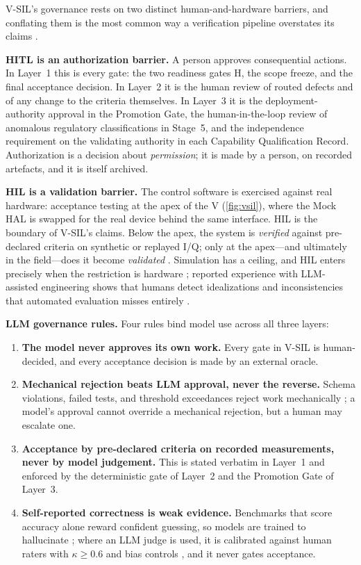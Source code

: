 \documentclass[11pt,a4paper]{article}
\newcommand{\verified}{\emph{verified}}
\newcommand{\validated}{\emph{validated}}
\begin{document}
V-SIL's governance rests on two distinct human-and-hardware barriers, and conflating them is the
most common way a verification pipeline overstates its claims \cite{opalrt2026,sheridan2026b}.

\textbf{HITL is an authorization barrier.} A person approves consequential actions. In Layer~1
this is every gate: the two readiness gates H, the scope freeze, and the final acceptance
decision. In Layer~2 it is the human review of routed defects and of any change to the criteria
themselves. In Layer~3 it is the deployment-authority approval in the Promotion Gate, the
human-in-the-loop review of anomalous regulatory classifications in Stage~5, and the
independence requirement on the validating authority in each Capability Qualification Record.
Authorization is a decision about \emph{permission}; it is made by a person, on recorded
artefacts, and it is itself archived.

\textbf{HIL is a validation barrier.} The control software is exercised against real hardware:
acceptance testing at the apex of the V (\cref{fig:vsil}), where the Mock HAL is swapped for the
real device behind the same interface. HIL is the boundary of V-SIL's claims. Below the apex, the
system is \verified{} against pre-declared criteria on synthetic or replayed I/Q; only at the
apex---and ultimately in the field---does it become \validated{} \cite{sheridan2026b}. Simulation
has a ceiling, and HIL enters precisely when the restriction is hardware \cite{opalrt2026};
reported experience with LLM-assisted engineering shows that humans detect idealizations and
inconsistencies that automated evaluation misses entirely \cite{heinrichs2026,bajestani2026}.

\textbf{LLM governance rules.} Four rules bind model use across all three layers:

\begin{enumerate}[label=\textbf{G\arabic*.}]
  \item \textbf{The model never approves its own work.} Every gate in V-SIL is human-decided,
    and every acceptance decision is made by an external oracle.
  \item \textbf{Mechanical rejection beats LLM approval, never the reverse.} Schema violations,
    failed tests, and threshold exceedances reject work mechanically
    \cite{mcp2025,tooluse2026}; a model's approval cannot override a mechanical rejection, but a
    human may escalate one.
  \item \textbf{Acceptance by pre-declared criteria on recorded measurements, never by model
    judgement.} This is stated verbatim in Layer~1 and enforced by the deterministic gate of
    Layer~2 and the Promotion Gate of Layer~3.
  \item \textbf{Self-reported correctness is weak evidence.} Benchmarks that score accuracy alone
    reward confident guessing, so models are trained to hallucinate \cite{kalai2026}; where an
    LLM judge is used, it is calibrated against human raters with $\kappa \geq 0.6$ and bias
    controls \cite{futureagi2026,judge2026}, and it never gates acceptance.
\end{enumerate}
\end{document}
